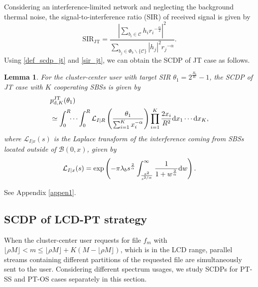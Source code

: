 \documentclass[twocolumns,10pt]{IEEEtran}
\newtheorem{lemma}{Lemma}
\begin{document}
Considering an interference-limited network and neglecting the background thermal noise, the signal-to-interference ratio (SIR) of received signal is given by
\begin{equation}
\text{SIR}_{\text{JT}}=\frac{ \left|\sum\limits_{b_i\in \mathcal{C}}h_i {r_i}^{-\frac{\alpha}{2}}\right|^2}{\sum\limits_{b_j\in \Phi_b \backslash \{\mathcal{C}\}} |h_j|^2 {r_j}^{-\alpha}}.
\label{sir_jt}
\end{equation} 
Using  \eqref{def_scdp_jt} and \eqref{sir_jt}, we can obtain the SCDP of JT case as follows.

\begin{lemma}
	\label{lemma1}
	For the cluster-center user with target SIR $\theta_1=2^{\frac{R_b}{W}}-1$,
	the SCDP of JT case with $K$ cooperating SBSs is given by
	\begin{equation}
	\begin{split}
	&p_{\textnormal{d},K}^{\textnormal{JT}}(\theta_1)  \\
	& \simeq \int_{0}^{R}\!\!\cdots\int_{0}^{R} \mathcal{L}_{I|R} \left(\frac{\theta_1}{\sum_{i=1}^{K}x_i^{-\alpha}}\right) \prod\limits_{i=1}^{K} \frac{2 x_i}{R^2} \textnormal{d}x_1 \cdots \textnormal{d}x_K,
	\end{split}
	\label{Psuc_JT_expression}
	\end{equation} 
	where $\mathcal{L}_{I|x} (s)$ is the Laplace transform of the interference coming from SBSs located outside of $\mathcal{B}(0,x)$, given by
	\begin{equation}\label{eq:Laplace}
	\mathcal{L}_{I|x}(s)=\exp\left(-\pi \lambda_b s^{\frac{2}{\alpha}} \int_{\frac{x^2}{s^{2/\alpha}}}^{\infty} \frac{1}{1+w^{\frac{2}{\alpha}}} \textnormal{d}w\right).
	\end{equation}
\end{lemma}
\begin{IEEEproof}
	\textnormal{See Appendix \ref{appen1}.}
\end{IEEEproof}


\subsection{SCDP of LCD-PT strategy} 
When the cluster-center user requests for file $f_m$ with $\lfloor\rho M \rfloor < m\leq \lfloor \rho M\rfloor+K(M-\lfloor \rho M\rfloor) $, which is in the LCD range, parallel streams containing different partitions of the requested file are simultaneously sent to the user. Considering different spectrum usages, we study SCDPs for PT-SS and PT-OS cases separately in this section.
\end{document}
